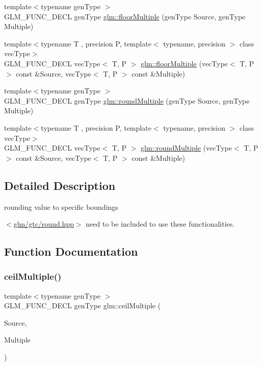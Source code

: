 \begin{DoxyCompactItemize}
\item 
{\footnotesize template$<$typename gen\+Type $>$ }\\G\+L\+M\+\_\+\+F\+U\+N\+C\+\_\+\+D\+E\+CL gen\+Type \hyperlink{group__gtc__round_ga9eafb9dbedf84e5cece65c2fe9d5631d}{glm\+::floor\+Multiple} (gen\+Type Source, gen\+Type Multiple)
\item 
{\footnotesize template$<$typename T , precision P, template$<$ typename, precision $>$ class vec\+Type$>$ }\\G\+L\+M\+\_\+\+F\+U\+N\+C\+\_\+\+D\+E\+CL vec\+Type$<$ T, P $>$ \hyperlink{group__gtc__round_ga6912db42d43873fe1dedb3aed2b7a239}{glm\+::floor\+Multiple} (vec\+Type$<$ T, P $>$ const \&Source, vec\+Type$<$ T, P $>$ const \&Multiple)
\item 
{\footnotesize template$<$typename gen\+Type $>$ }\\G\+L\+M\+\_\+\+F\+U\+N\+C\+\_\+\+D\+E\+CL gen\+Type \hyperlink{group__gtc__round_ga6739d1de04b2cea7c78675b365644bce}{glm\+::round\+Multiple} (gen\+Type Source, gen\+Type Multiple)
\item 
{\footnotesize template$<$typename T , precision P, template$<$ typename, precision $>$ class vec\+Type$>$ }\\G\+L\+M\+\_\+\+F\+U\+N\+C\+\_\+\+D\+E\+CL vec\+Type$<$ T, P $>$ \hyperlink{group__gtc__round_ga10a8ab7b254257b607b6a3fc68c3e661}{glm\+::round\+Multiple} (vec\+Type$<$ T, P $>$ const \&Source, vec\+Type$<$ T, P $>$ const \&Multiple)
\end{DoxyCompactItemize}


\subsection{Detailed Description}
rounding value to specific boundings 

$<$\hyperlink{round_8hpp}{glm/gtc/round.\+hpp}$>$ need to be included to use these functionalities. 

\subsection{Function Documentation}
\mbox{\label{group__gtc__round_gac84898c466e609cdd2e81d9ba907d9e8}} 
\subsubsection{\texorpdfstring{ceil\+Multiple()}{ceilMultiple()}\hspace{0.1cm}{\footnotesize\ttfamily [1/2]}}
{\footnotesize\ttfamily template$<$typename gen\+Type $>$ \\
G\+L\+M\+\_\+\+F\+U\+N\+C\+\_\+\+D\+E\+CL gen\+Type glm\+::ceil\+Multiple (\begin{DoxyParamCaption}\item[{gen\+Type}]{Source,  }\item[{gen\+Type}]{Multiple }\end{DoxyParamCaption})}


